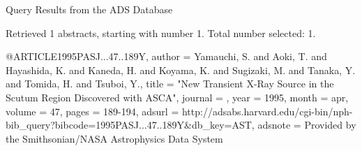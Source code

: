 Query Results from the ADS Database


Retrieved 1 abstracts, starting with number 1.  Total number selected: 1.

@ARTICLE{1995PASJ...47..189Y,
   author = {{Yamauchi}, S. and {Aoki}, T. and {Hayashida}, K. and {Kaneda}, H. and 
	{Koyama}, K. and {Sugizaki}, M. and {Tanaka}, Y. and {Tomida}, H. and 
	{Tsuboi}, Y.},
    title = "{New Transient X-Ray Source in the Scutum Region Discovered with ASCA}",
  journal = {\pasj},
     year = 1995,
    month = apr,
   volume = 47,
    pages = {189-194},
   adsurl = {http://adsabs.harvard.edu/cgi-bin/nph-bib_query?bibcode=1995PASJ...47..189Y&db_key=AST},
  adsnote = {Provided by the Smithsonian/NASA Astrophysics Data System}
}


